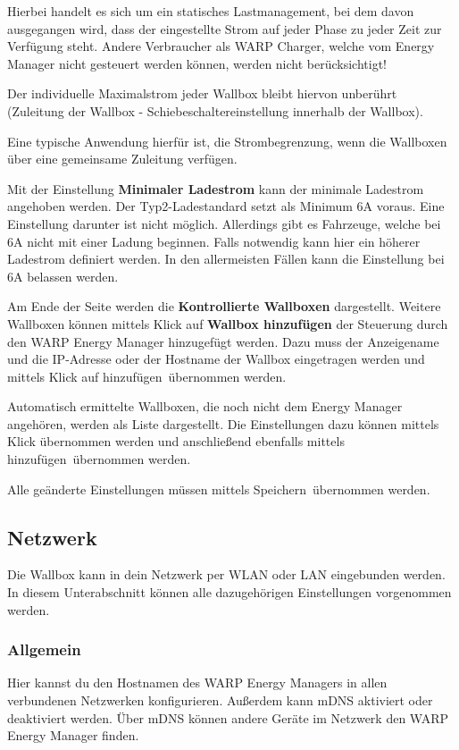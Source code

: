 \documentclass[a4paper,10pt]{article}
\newcommand{\hint}[1]{\begin{tcolorbox}[colback=boxgray,colframe=black,coltext=
white,title=Hinweis,left*=2mm,right*=2mm,boxsep=1mm,bottom=1mm,top=1mm]#1\end{tcolorbox}}
\begin{document}
\begin{multicols*}{2}
	\hint{Hierbei handelt es sich um ein statisches Lastmanagement, bei dem
	davon ausgegangen wird, dass der eingestellte Strom auf jeder Phase
	zu jeder Zeit zur Verfügung steht. Andere Verbraucher als WARP Charger, 
	welche vom Energy Manager nicht gesteuert werden können, werden nicht
	berücksichtigt!}

	Der individuelle Maximalstrom jeder Wallbox bleibt hiervon unberührt
	(Zuleitung der Wallbox - Schiebeschaltereinstellung innerhalb der Wallbox).

	Eine typische Anwendung hierfür ist, die Strombegrenzung, 
	wenn die Wallboxen über eine gemeinsame Zuleitung verfügen.

	Mit der Einstellung \textbf{Minimaler Ladestrom} kann der minimale Ladestrom
	angehoben werden. Der Typ2-Ladestandard setzt als Minimum 6A voraus. Eine
	Einstellung darunter ist nicht möglich. Allerdings gibt es Fahrzeuge, welche 
	bei 6A nicht mit einer Ladung beginnen. Falls notwendig kann hier ein höherer 
	Ladestrom definiert werden. In den allermeisten Fällen kann die Einstellung
	bei 6A belassen werden.

	Am Ende der Seite werden die \textbf{Kontrollierte
	Wallboxen} dargestellt. Weitere Wallboxen können mittels Klick auf
	\textbf{Wallbox hinzufügen} der Steuerung durch den WARP Energy Manager
	hinzugefügt werden. Dazu muss der Anzeigename und die IP-Adresse oder der
	Hostname der Wallbox eingetragen werden und mittels Klick auf \glqq
	hinzufügen\grqq~übernommen werden.

	Automatisch ermittelte Wallboxen, die noch nicht dem Energy Manager
	angehören, werden als Liste dargestellt. Die Einstellungen dazu können
	mittels Klick übernommen werden und anschließend ebenfalls mittels \glqq
	hinzufügen\grqq~übernommen werden.

	Alle geänderte Einstellungen müssen mittels \glqq Speichern\grqq~übernommen 
	werden.


	\subsection{Netzwerk}
	\label{network}
	Die Wallbox kann in dein Netzwerk per WLAN oder LAN eingebunden werden.
	In diesem Unterabschnitt können alle dazugehörigen Einstellungen vorgenommen werden.

	\subsubsection{Allgemein}
	Hier kannst du den Hostnamen des WARP Energy Managers in allen verbundenen Netzwerken konfigurieren. Außerdem kann mDNS aktiviert oder deaktiviert werden.
	Über mDNS können andere Geräte im Netzwerk den WARP Energy Manager finden.


\end{multicols*}
\end{document}
